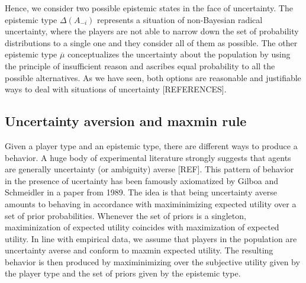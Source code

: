 \documentclass[fleqn,reqno,11pt]{article}
\begin{document}
Hence, we consider two possible epistemic states in the face of uncertainty. The epistemic type $\Delta(A_{-i})$ represents a situation of non-Bayesian radical uncertainty, where the players are not able to narrow down the set of probability distributions to a single one and they consider all of them as possible. The other epistemic type $\overline{\mu}$ conceptualizes the uncertainty about the population by using the principle of insufficient reason and ascribes equal probability to all the possible alternatives. As we have seen, both options are reasonable and justifiable ways to deal with situations of uncertainty [REFERENCES]. \\

\subsection{Uncertainty aversion and maxmin rule}


Given a player type and an epistemic type, there are different ways to produce a behavior. A
huge body of experimental literature strongly suggests that agents are generally uncertainty
(or ambiguity) averse [REF]. This pattern of behavior in the presence of ucertainty has been
famously axiomatized by Gilboa and Schmeidler in a paper from 1989. The idea is that being
uncertainty averse amounts to behaving in accordance with maximinimizing expected utility over
a set of prior probabilities. Whenever the set of priors is a singleton, maximinization of
expected utility coincides with maximization of expected utility. In line with empirical data,
we assume that players in the population are uncertainty averse and conform to maxmin expected
utility. The resulting behavior is then produced by maximinimizing over the subjective utility
given by the player type and the set of priors given by the epistemic type.
\end{document}
